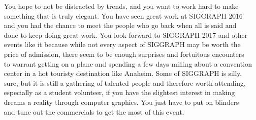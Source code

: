 \documentclass[../main.tex]{subfiles}
\begin{document}
You hope to not be distracted by trends, and you want to work hard to make something that is truly elegant. You have seen great work at SIGGRAPH 2016 and you had the chance to meet the people who go back when all is said and done to keep doing great work. You look forward to SIGGRAPH 2017 and other events like it because while not every aspect of SIGGRAPH may be worth the price of admission, there seem to be enough surprises and fortuitous encounters to warrant getting on a plane and spending a few days milling about a convention center in a hot touristy destination like Anaheim. Some of SIGGRAPH is silly, sure, but it is still a gathering of talented people and therefore worth attending, especially as a student volunteer, if you have the slightest interest in making dreams a reality through computer graphics. You just have to put on blinders and tune out the commercials to get the most of this event.
\end{document}
